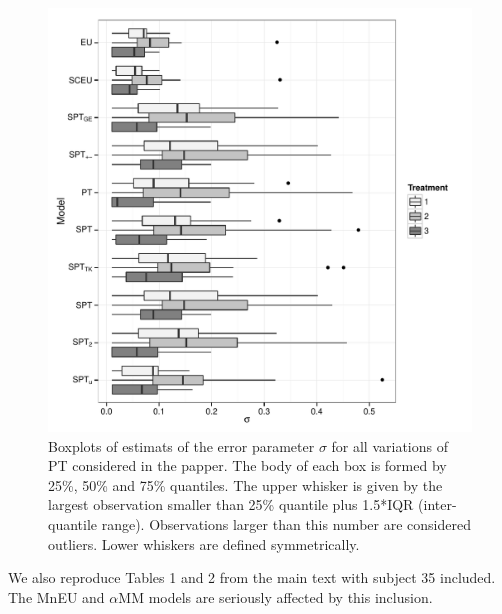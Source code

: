 \documentclass[11pt, a4paper, oneside,final,notitlepage,onecolumn]{article}\usepackage[]{graphicx}\usepackage[]{color}
\makeatletter
\def\maxwidth{ %
  \ifdim\Gin@nat@width>\linewidth
    \linewidth
  \else
    \Gin@nat@width
  \fi
}
\makeatother
\begin{document}
\begin{figure}
\includegraphics[width=\maxwidth]{figure/sigma_par_boxplot-1} \caption[Boxplots of estimats of the error parameter ]{Boxplots of estimats of the error parameter $\sigma$ for all variations of PT considered in the papper. The body of each box is formed by 25\%, 50\% and 75\% quantiles. The upper whisker is given by the largest observation smaller than 25\% quantile plus 1.5*IQR (inter-quantile range). Observations larger than this number are considered outliers. Lower whiskers are defined symmetrically.}\label{fig:sigma_par_boxplot}
\end{figure}




We also reproduce Tables 1 and 2 from the main text with subject 35 included.  The  MnEU and $\alpha$MM  models are seriously affected by this inclusion.
\end{document}
